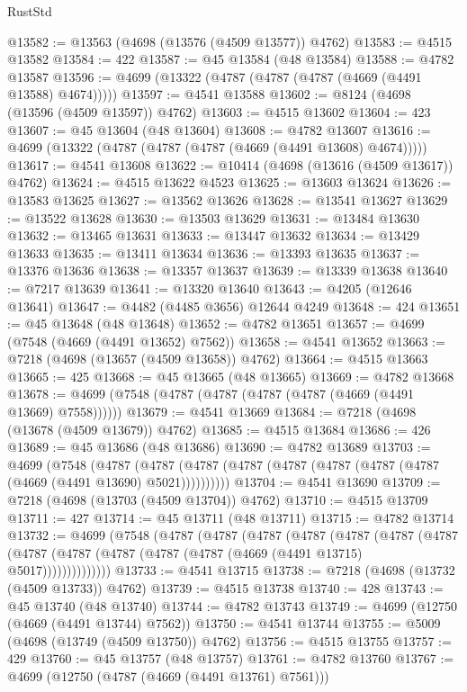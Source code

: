 \begin{lexlean}{RustStd}
\begin{coremodule}
@13582 := @13563 (@4698 (@13576 (@4509 @13577)) @4762)
@13583 := @4515 @13582
@13584 := 422
@13587 := @45 @13584 (@48 @13584)
@13588 := @4782 @13587
@13596 := @4699 (@13322 (@4787 (@4787 (@4787 (@4669 (@4491 @13588) @4674)))))
@13597 := @4541 @13588
@13602 := @8124 (@4698 (@13596 (@4509 @13597)) @4762)
@13603 := @4515 @13602
@13604 := 423
@13607 := @45 @13604 (@48 @13604)
@13608 := @4782 @13607
@13616 := @4699 (@13322 (@4787 (@4787 (@4787 (@4669 (@4491 @13608) @4674)))))
@13617 := @4541 @13608
@13622 := @10414 (@4698 (@13616 (@4509 @13617)) @4762)
@13624 := @4515 @13622 @4523
@13625 := @13603 @13624
@13626 := @13583 @13625
@13627 := @13562 @13626
@13628 := @13541 @13627
@13629 := @13522 @13628
@13630 := @13503 @13629
@13631 := @13484 @13630
@13632 := @13465 @13631
@13633 := @13447 @13632
@13634 := @13429 @13633
@13635 := @13411 @13634
@13636 := @13393 @13635
@13637 := @13376 @13636
@13638 := @13357 @13637
@13639 := @13339 @13638
@13640 := @7217 @13639
@13641 := @13320 @13640
@13643 := @4205 (@12646 @13641)
@13647 := @4482 (@4485 @3656) @12644 @4249
@13648 := 424
@13651 := @45 @13648 (@48 @13648)
@13652 := @4782 @13651
@13657 := @4699 (@7548 (@4669 (@4491 @13652) @7562))
@13658 := @4541 @13652
@13663 := @7218 (@4698 (@13657 (@4509 @13658)) @4762)
@13664 := @4515 @13663
@13665 := 425
@13668 := @45 @13665 (@48 @13665)
@13669 := @4782 @13668
@13678 := @4699 (@7548 (@4787 (@4787 (@4787 (@4787 (@4669 (@4491 @13669) @7558))))))
@13679 := @4541 @13669
@13684 := @7218 (@4698 (@13678 (@4509 @13679)) @4762)
@13685 := @4515 @13684
@13686 := 426
@13689 := @45 @13686 (@48 @13686)
@13690 := @4782 @13689
@13703 := @4699
    (@7548
      (@4787 (@4787 (@4787 (@4787 (@4787 (@4787 (@4787 (@4787 (@4669 (@4491 @13690) @5021))))))))))
@13704 := @4541 @13690
@13709 := @7218 (@4698 (@13703 (@4509 @13704)) @4762)
@13710 := @4515 @13709
@13711 := 427
@13714 := @45 @13711 (@48 @13711)
@13715 := @4782 @13714
@13732 := @4699
    (@7548
      (@4787
        (@4787
          (@4787
            (@4787
              (@4787
                (@4787
                  (@4787
                    (@4787 (@4787 (@4787 (@4787 (@4787 (@4669 (@4491 @13715) @5017))))))))))))))
@13733 := @4541 @13715
@13738 := @7218 (@4698 (@13732 (@4509 @13733)) @4762)
@13739 := @4515 @13738
@13740 := 428
@13743 := @45 @13740 (@48 @13740)
@13744 := @4782 @13743
@13749 := @4699 (@12750 (@4669 (@4491 @13744) @7562))
@13750 := @4541 @13744
@13755 := @5009 (@4698 (@13749 (@4509 @13750)) @4762)
@13756 := @4515 @13755
@13757 := 429
@13760 := @45 @13757 (@48 @13757)
@13761 := @4782 @13760
@13767 := @4699 (@12750 (@4787 (@4669 (@4491 @13761) @7561)))

\end{coremodule}
\end{lexlean}

